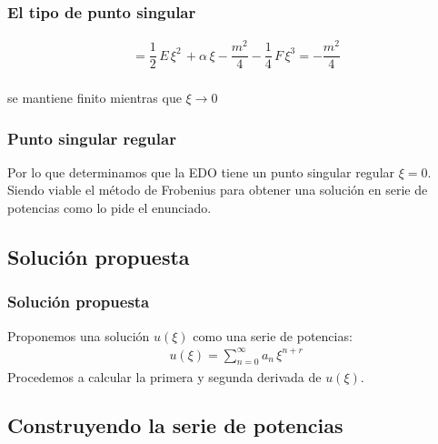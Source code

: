 \documentclass[12pt]{beamer}
\begin{document}
\begin{frame}
\frametitle{El tipo de punto singular}
\begin{align*}
= \dfrac{1}{2} \, E \, \xi^{2} \, + \alpha \, \xi - \dfrac{m^{2}}{4} - \dfrac{1}{4} \, F \, \xi^{3} = - \dfrac{m^{2}}{4}
\end{align*}
\\
\bigskip
se mantiene finito mientras que $\xi \to 0$
\end{frame}
\begin{frame}
\frametitle{Punto singular regular}
Por lo que determinamos que la EDO tiene un punto singular regular $\xi = 0$.
\\
\bigskip
\pause
Siendo viable el método de Frobenius para obtener una solución en serie de potencias como lo pide el enunciado.
\end{frame}

\subsection{Solución propuesta}

\begin{frame}
\frametitle{Solución propuesta}
Proponemos una solución $u(\xi)$ como una serie de potencias:
\begin{align*}
u(\xi) = \sum_{n=0}^{\infty} a_{n} \, \xi^{n+r}
\end{align*}
\pause
Procedemos a calcular la primera y segunda derivada de $u(\xi)$.
\end{frame}

\subsection{Construyendo la serie de potencias}
\end{document}
